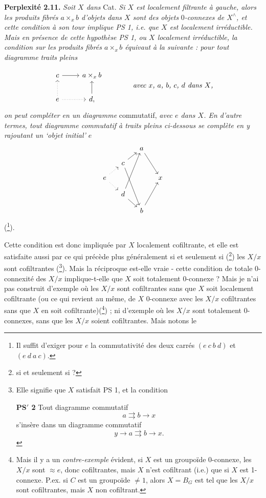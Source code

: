 \documentclass[11pt]{article}
\newcommand{\printedpage}[1]{\marginpar{\footnotesize p.~#1}}
\newcommand{\msp}[1]{\marginpar{\footnotesize [#1]}}
\begin{document}
\textbf{Perplexité 2.11.} \textit{Soit $X$ dans} Cat. \textit{Si $X$ est localement filtrante à gauche, alors les produits fibrés $a\times_x b$ d'objets dans $X$ sont des objets} $0$\textit{-connexes de $X^\wedge$, et cette condition à son tour implique PS 1, i.e. que $X$ est localement irréductible. Mais en présence de cette hypothèse PS 1, ou $X$ localement irréductible, la condition sur les produits fibrés $a\times_x b$ équivaut à la suivante : pour tout diagramme} \textit{traits pleins}

\msp{page 28}
\[
\begin{tikzcd}
c \arrow[r] & a\times_x b \\
e \arrow[u, dotted] \arrow[r, dotted] & d, \arrow[u]
\end{tikzcd}
\qquad\qquad
\textit{avec $x$, $a$, $b$, $c$, $d$ dans $X$,}
\]
\textit{on peut compléter en un diagramme} commutatif, \textit{avec $e$ dans $X$. En d'autre termes, tout diagramme commutatif à traits pleins ci-dessous se complète en y rajoutant un `objet initial' $e$} %
\[
\begin{tikzcd}[column sep=small, row sep=small]
 & & a \arrow[ddr] & \\
 & c \arrow[ur] \arrow[dddr] & & \\
e \arrow[ur, dotted] \arrow[dr, dotted] & & & x \\
 & d \arrow[uuur] \arrow[dr] & & \\
 & & b \arrow[uur] &
\end{tikzcd}
\]
(\footnote[33]{Il suffit d'exiger pour $e$ la commutativité des deux carrés $(e\ c\ b\ d)$ et $(e\ d\ a\ c)$.}).

Cette condition est donc impliquée par $X$ localement cofiltrante, et elle est satisfaite aussi par ce qui précède plus généralement si et seulement si (\footnote[34]{si et seulement si ?}) les $X/x$ sont cofiltrantes (\footnote[35]{Elle signifie que $X$ satisfait PS 1, et la condition

\textbf{PS$'$ 2} Tout diagramme commutatif
\[
a\rightrightarrows b\longrightarrow x
\]
s'insère dans un diagramme commutatif
\[
y\longrightarrow a\rightrightarrows b\longrightarrow x.
\]
}). Mais la réciproque est-elle vraie - cette condition de totale 0-connexité des $X/x$ implique-t-elle que $X$ soit totalement 0-connexe ? Mais je n'ai pas construit d'exemple où les $X/x$
\printedpage{18}
sont cofiltrantes sans que $X$ soit localement cofiltrante (ou ce qui revient au même, de $X$ 0-connexe avec les $X/x$ cofiltrantes sans que $X$ en soit cofiltrante)(\footnote[36]{Mais il y a un \textit{contre-exemple} évident, si $X$ est un groupoïde 0-connexe, les $X/x$ sont $\approx e$, donc cofiltrantes, mais $X$ n'est cofiltrant (i.e.) que si $X$ est 1-connexe. P.ex. si $C$ est un groupoïde $\neq 1$, alors $X=B_G$ est tel que les $X/x$ sont cofiltrantes, mais $X$ non cofiltrant. %
}) ; ni d'exemple où les $X/x$ sont totalement 0-connexes, sans que les $X/x$ soient cofiltrantes. Mais notons le
\end{document}
